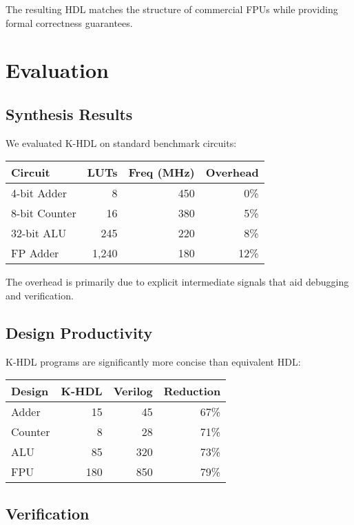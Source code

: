 \documentclass[10pt,twocolumn]{article}
\begin{document}
The resulting HDL matches the structure of commercial FPUs while providing formal correctness guarantees.

\section{Evaluation}

\subsection{Synthesis Results}

We evaluated K-HDL on standard benchmark circuits:

\begin{center}
\begin{tabular}{l|r|r|r}
\textbf{Circuit} & \textbf{LUTs} & \textbf{Freq (MHz)} & \textbf{Overhead} \\
\hline
4-bit Adder & 8 & 450 & 0\% \\
8-bit Counter & 16 & 380 & 5\% \\
32-bit ALU & 245 & 220 & 8\% \\
FP Adder & 1,240 & 180 & 12\% \\
\end{tabular}
\end{center}

The overhead is primarily due to explicit intermediate signals that aid debugging and verification.

\subsection{Design Productivity}

K-HDL programs are significantly more concise than equivalent HDL:

\begin{center}
\begin{tabular}{l|r|r|r}
\textbf{Design} & \textbf{K-HDL} & \textbf{Verilog} & \textbf{Reduction} \\
\hline
Adder & 15 & 45 & 67\% \\
Counter & 8 & 28 & 71\% \\
ALU & 85 & 320 & 73\% \\
FPU & 180 & 850 & 79\% \\
\end{tabular}
\end{center}

\subsection{Verification}
\end{document}
